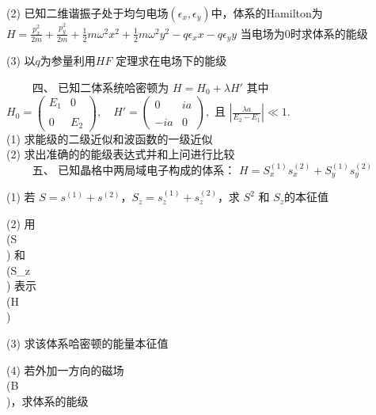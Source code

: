 (2) 已知二维谐振子处于均匀电场$(\epsilon_x, \epsilon_y)$中，体系的Hamilton为 
$H = \frac{p_x^2}{2m} + \frac{p_y^2}{2m} + \frac{1}{2}m\omega^2 x^2 + \frac{1}{2}m\omega^2 y^2 - q\epsilon_x x - q\epsilon_y y$
当电场为0时求体系的能级

(3) 以$q$为参量利用$HF$ 定理求在电场下的能级

　　 四、
已知二体系统哈密顿为 
$H = H_0 + \lambda H'$
其中
$H_0 = \begin{pmatrix}E_1 & 0 \\\\0 & E_2\end{pmatrix}, \quad H' = \begin{pmatrix}0 & ia \\\\-ia & 0\end{pmatrix},$
且 $\left|\frac{\lambda a}{E_2 - E_1}\right| \ll 1$.\\
(1) 求能级的二级近似和波函数的一级近似\\
(2) 求出准确的的能级表达式并和上问进行比较\\

　　 五、
已知晶格中两局域电子构成的体系：
$H = S_x^{(1)} s_x^{(2)} + S_y^{(1)} s_y^{(2)}$

(1) 若 $S = s^{(1)} + s^{(2)}$，$S_z = s_z^{(1)} + s_z^{(2)}$，求 $S^2$ 和 $S_z$的本征值

(2) 用 \\(S\\) 和 \\(S_z\\) 表示 \\(H\\)

(3) 求该体系哈密顿的能量本征值

(4) 若外加一方向的磁场 \\(B\\)，求体系的能级
